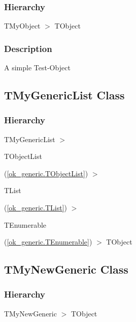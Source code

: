 \documentclass{report}
\newif\ifpdf
\begin{document}
\subsubsection*{\large{\textbf{Hierarchy}}\normalsize\hspace{1ex}\hfill}
TMyObject {$>$} TObject
\subsubsection*{\large{\textbf{Description}}\normalsize\hspace{1ex}\hfill}
A simple Test{-}Object\ifpdf
\subsection*{\large{\textbf{TMyGenericList Class}}\normalsize\hspace{1ex}\hrulefill}
\else
\subsection*{TMyGenericList Class}
\fi
\label{ok_generic.TMyGenericList}
\subsubsection*{\large{\textbf{Hierarchy}}\normalsize\hspace{1ex}\hfill}
TMyGenericList {$>$} \begin{ttfamily}TObjectList\end{ttfamily}(\ref{ok_generic.TObjectList}) {$>$} \begin{ttfamily}TList\end{ttfamily}(\ref{ok_generic.TList}) {$>$} \begin{ttfamily}TEnumerable\end{ttfamily}(\ref{ok_generic.TEnumerable}) {$>$} 
TObject
\ifpdf
\subsection*{\large{\textbf{TMyNewGeneric Class}}\normalsize\hspace{1ex}\hrulefill}
\else
\subsection*{TMyNewGeneric Class}
\fi
\label{ok_generic.TMyNewGeneric}
\subsubsection*{\large{\textbf{Hierarchy}}\normalsize\hspace{1ex}\hfill}
TMyNewGeneric {$>$} TObject
\end{document}
